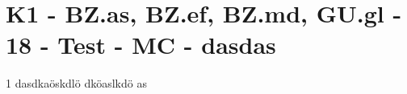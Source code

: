 \section{K1 - BZ.as, BZ.ef, BZ.md, GU.gl - 18 - Test - MC - dasdas}

\begin{langesbeispiel} \item[1] %
dasdkaöskdlö dköaslkdö as
\end{langesbeispiel}